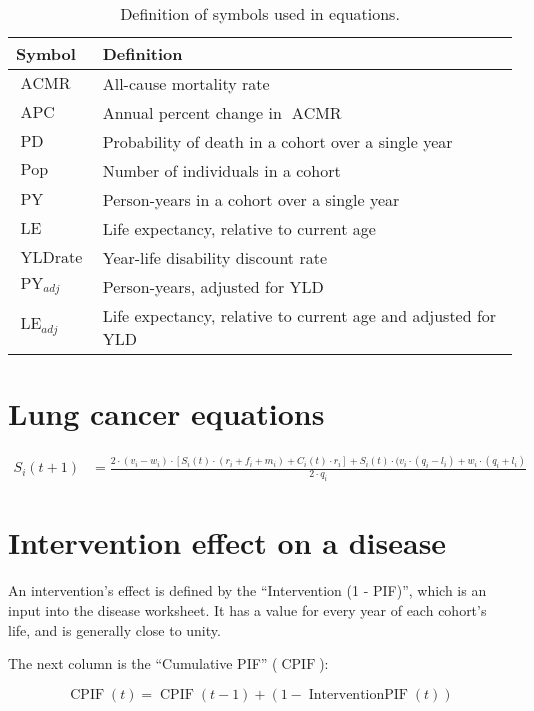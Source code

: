 \documentclass[12pt]{scrartcl}
\DeclareMathOperator{\APC}{APC}
\DeclareMathOperator{\ACMR}{ACMR}
\DeclareMathOperator{\PD}{PD}
\DeclareMathOperator{\PY}{PY}
\DeclareMathOperator{\LE}{LE}
\DeclareMathOperator{\Pop}{Pop}
\DeclareMathOperator{\YLDrate}{YLDrate}
\DeclareMathOperator{\CPIF}{CPIF}
\DeclareMathOperator{\IPIF}{InterventionPIF}
\begin{document}
\begin{table}
  \centering
  \begin{tabular}{ll}
    \toprule
    Symbol & Definition \\
    \midrule
    \(\ACMR\) & All-cause mortality rate \\
    \(\APC\) & Annual percent change in \(\ACMR\) \\
    \(\PD\) & Probability of death in a cohort over a single year \\
    \(\Pop\) & Number of individuals in a cohort \\
    \(\PY\) & Person-years in a cohort over a single year \\
    \(\LE\) & Life expectancy, relative to current age \\
    \(\YLDrate\) & Year-life disability discount rate \\
    \(\PY_{adj}\) & Person-years, adjusted for YLD \\
    \(\LE_{adj}\) & Life expectancy, relative to current age and adjusted for YLD \\
    \bottomrule
  \end{tabular}
  \caption{Definition of symbols used in equations.}
  \label{tbl:defns}
\end{table}

\section*{Lung cancer equations}

\begin{align*}
  S_i(t+1) &= \frac{2 \cdot (v_i - w_i) \cdot%
    \left[ S_i(t) \cdot(r_i + f_i + m_i) + C_i(t) \cdot r_i \right]%
    + S_i(t) \cdot (v_i \cdot (q_i - l_i) + w_i \cdot (q_i + l_i)%
  }{2 \cdot q_i}
\end{align*}

\section*{Intervention effect on a disease}

An intervention's effect is defined by the ``Intervention (1 - PIF)'', which is an input into the disease worksheet. It has a value for every year of each cohort's life, and is generally close to unity.

The next column is the ``Cumulative PIF'' (\(\CPIF\)):

\begin{equation*}
  \CPIF(t) = \CPIF(t-1) + (1 - \IPIF(t))
\end{equation*}
\end{document}

